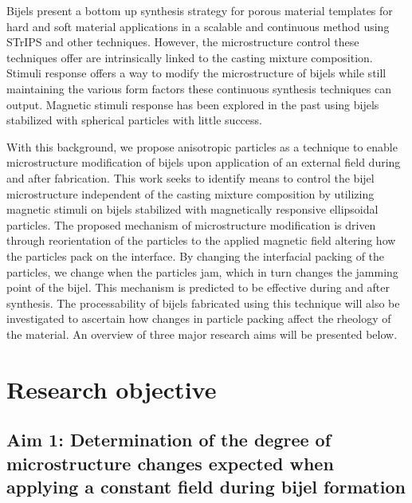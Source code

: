 Bijels present a bottom up synthesis strategy for porous material templates for hard and soft material applications in a scalable and 
continuous method using STrIPS and other techniques. However, the microstructure control these techniques offer are intrinsically linked 
to the casting mixture composition. Stimuli response offers a way to modify the microstructure of bijels while still maintaining the 
various form factors these continuous synthesis techniques can output. Magnetic stimuli response has been explored in the past using bijels 
stabilized with spherical particles with little success. \cite{kim_bijels_2010} 

With this background, we propose anisotropic particles as a technique to enable microstructure modification of bijels 
upon application of an external field during and after fabrication. This work seeks to identify means to control the bijel microstructure independent 
of the casting mixture composition by utilizing magnetic stimuli on bijels stabilized with magnetically responsive ellipsoidal particles. 
The proposed mechanism of microstructure modification is driven through reorientation of the particles to the applied magnetic field altering 
how the particles pack on the interface. By changing the interfacial packing of the particles, we change when the particles jam, which in turn changes 
the jamming point of the bijel. This mechanism is predicted to be effective during and after synthesis. The processability of bijels fabricated using 
this technique will also be investigated to ascertain how changes in particle packing affect the rheology of the material. An overview of three major 
research aims will be presented below.

\section{Research objective}


\subsection{Aim 1: Determination of the degree of microstructure changes expected when applying a constant field during bijel formation}
\label{section:aim1_desc}

